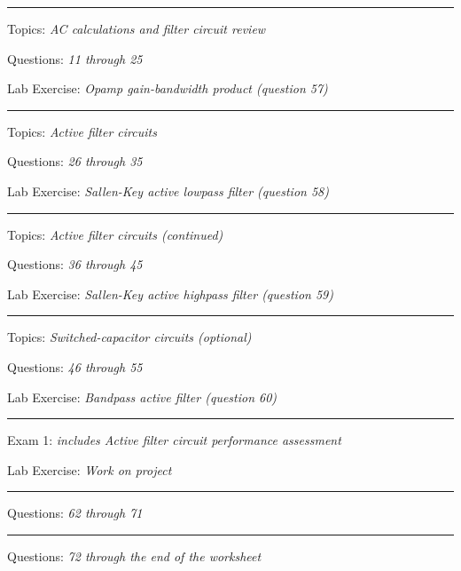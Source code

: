 
\vskip 10pt
\hrule \vskip 5pt
\noindent
{}

\hskip 10pt Topics: {\it AC calculations and filter circuit review}
 
\hskip 10pt Questions: {\it 11 through 25}
 
\hskip 10pt Lab Exercise: {\it Opamp gain-bandwidth product (question 57)}
 
\vskip 10pt
\hrule \vskip 5pt
\noindent
{}

\hskip 10pt Topics: {\it Active filter circuits}
 
\hskip 10pt Questions: {\it 26 through 35}
 
\hskip 10pt Lab Exercise: {\it Sallen-Key active lowpass filter (question 58)}
 
\vskip 10pt
\hrule \vskip 5pt
\noindent
{}

\hskip 10pt Topics: {\it Active filter circuits (continued)}
 
\hskip 10pt Questions: {\it 36 through 45}
 
\hskip 10pt Lab Exercise: {\it Sallen-Key active highpass filter (question 59)}
 
\vskip 10pt
\hrule \vskip 5pt
\noindent
{}

\hskip 10pt Topics: {\it Switched-capacitor circuits (optional)}
 
\hskip 10pt Questions: {\it 46 through 55}
 
\hskip 10pt Lab Exercise: {\it Bandpass active filter (question 60)}
 
\vskip 10pt
\hrule \vskip 5pt
\noindent
{}

\hskip 10pt Exam 1: {\it includes Active filter circuit performance assessment}
  
\hskip 10pt Lab Exercise: {\it Work on project}
 
\vskip 10pt
\hrule \vskip 5pt
\noindent
{}

\hskip 10pt Questions: {\it 62 through 71}
 
\vskip 10pt
\hrule \vskip 5pt
\noindent
{}

\hskip 10pt Questions: {\it 72 through the end of the worksheet}
 
